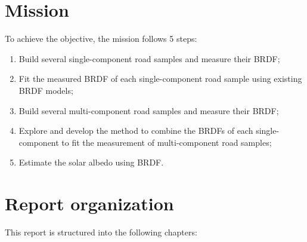 \section{Mission}
To achieve the objective, the mission follows 5 steps:
\begin{enumerate}
    \item Build several single-component road samples and measure their BRDF;
    \item Fit the measured BRDF of each single-component road sample using existing BRDF models;
    \item Build several multi-component road samples and measure their BRDF;
    \item Explore and develop the method to combine the BRDFs of each single-component to fit the measurement of multi-component road samples;
    \item Estimate the solar albedo using BRDF.
\end{enumerate}

\section{Report organization}
This report is structured into the following chapters: 
